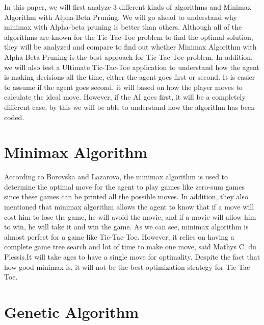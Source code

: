 \documentclass[12pt]{article}
\begin{document}
In this paper, we will first analyze 3 different kinds of algorithms and Minimax Algorithm with Alpha-Beta Pruning. We will go ahead to understand why minimax with Alpha-beta pruning is better than others. Although all of the algorithms are known for the Tic-Tac-Toe problem to find the optimal solution, they will be analyzed and compare to find out whether Minimax Algorithm with Alpha-Beta Pruning is the best approach for Tic-Tac-Toe problem. In addition, we will also test a Ultimate Tic-Tac-Toe application to understand how the agent is making decisions all the time, either the agent goes first or second. It is easier to assume if the agent goes second, it will based on how the player moves to calculate the ideal move. However, if the AI goes first, it will be a completely different case, by this we will be able to understand how the algorithm has been coded.
\section{Minimax Algorithm}

According to Borovska and Lazarova, the minimax algorithm is used to determine the optimal move for the agent to play games like zero-sum games since these games can be printed all the possible moves.\cite{Borovska:2007:EPM:1330598.1330615} In addition, they also mentioned that minimax algorithm allows the agent to know that if a move will cost him to lose the game, he will avoid the movie, and if a movie will allow him to win, he will take it and win the game. As we can see, minimax algorithm is almost perfect for a game like Tic-Tac-Toe. However, it relies on having a complete game tree search and lot of time to make one move, said Mathys C. du Plessis.\cite{duPlessis:2009:HNN:1632149.1632158}It will take ages to have a single move for optimality. Despite the fact that how good minimax is, it will not be the best optimization strategy for Tic-Tac-Toe.

\section{Genetic Algorithm}
\end{document}
